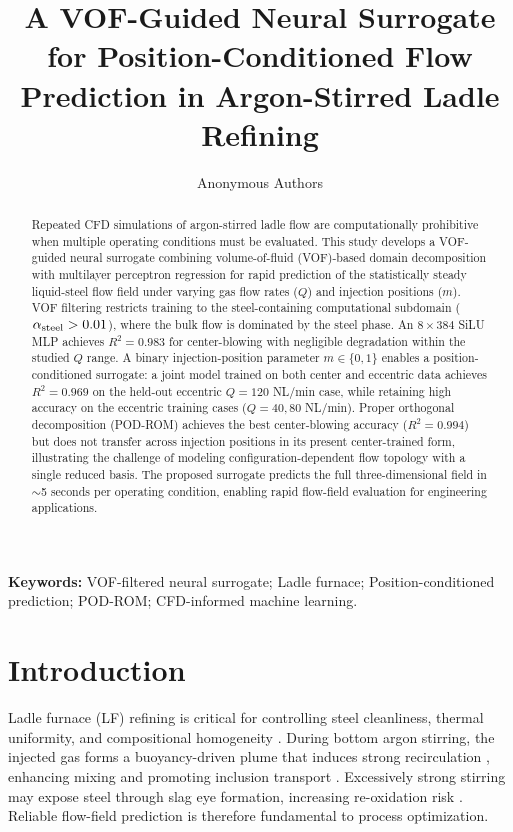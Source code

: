 \documentclass[12pt,a4paper]{article}
\begin{document}
\title{\bfseries A VOF-Guided Neural Surrogate for Position-Conditioned Flow Prediction in Argon-Stirred Ladle Refining}

\author[1]{Anonymous Authors}

\maketitle

\begin{abstract}
Repeated CFD simulations of argon-stirred ladle flow are computationally prohibitive when multiple operating conditions must be evaluated. This study develops a VOF-guided neural surrogate combining volume-of-fluid (VOF)-based domain decomposition with multilayer perceptron regression for rapid prediction of the statistically steady liquid-steel flow field under varying gas flow rates ($Q$) and injection positions ($m$). VOF filtering restricts training to the steel-containing computational subdomain ($\alpha_{\rm steel}>0.01$), where the bulk flow is dominated by the steel phase. An $8\times384$ SiLU MLP achieves $R^{2}=0.983$ for center-blowing with negligible degradation within the studied $Q$ range. A binary injection-position parameter $m\in\{0,1\}$ enables a position-conditioned surrogate: a joint model trained on both center and eccentric data achieves $R^{2}=0.969$ on the held-out eccentric $Q=120$ NL/min case, while retaining high accuracy on the eccentric training cases ($Q=40,80$ NL/min). Proper orthogonal decomposition (POD-ROM) achieves the best center-blowing accuracy ($R^{2}=0.994$) but does not transfer across injection positions in its present center-trained form, illustrating the challenge of modeling configuration-dependent flow topology with a single reduced basis. The proposed surrogate predicts the full three-dimensional field in $\sim$5 seconds per operating condition, enabling rapid flow-field evaluation for engineering applications.
\end{abstract}

\bigskip
\noindent\textbf{Keywords:} VOF-filtered neural surrogate; Ladle furnace; Position-conditioned prediction; POD-ROM; CFD-informed machine learning.

\section{Introduction}

Ladle furnace (LF) refining is critical for controlling steel cleanliness, thermal uniformity, and compositional homogeneity \cite{liu2026cfd}. During bottom argon stirring, the injected gas forms a buoyancy-driven plume that induces strong recirculation \cite{mazumdar1995physical}, enhancing mixing and promoting inclusion transport \cite{li2020numerical}. Excessively strong stirring may expose steel through slag eye formation, increasing re-oxidation risk \cite{jonsson1996modeling}. Reliable flow-field prediction is therefore fundamental to process optimization.
\end{document}
